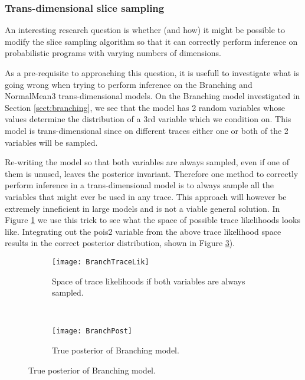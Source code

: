 \subsubsection{Trans-dimensional slice sampling}
\label{sect:tdSlice}
An interesting research question is whether (and how) it might be possible to modify the slice sampling algorithm so that it can correctly perform inference on probabilistic programs with varying numbers of dimensions.

As a pre-requisite to approaching this question, it is usefull to investigate what is going wrong when trying to perform inference on the Branching and NormalMean3 trans-dimensional models. On the Branching model investigated in Section \ref{sect:branching}, we see that the model has 2 random variables whose values determine the distribution of a 3rd variable which we condition on. This model is trans-dimensional since on different traces either one or both of the 2 variables will be sampled.

Re-writing the model so that both variables are always sampled, even if one of them is unused, leaves the posterior invariant. Therefore one method to correctly perform inference in a trans-dimensional model is to always sample all the variables that might ever be used in any trace. This approach will however be extremely inneficient in large models and is not a viable general solution. In Figure \ref{fig:branchTraceLik} we use this trick to see what the space of possible trace likelihoods looks like. Integrating out the pois2 variable from the above trace likelihood space results in the correct posterior distribution, shown in Figure \ref{fig:branchPost}).

\begin{figure}[h]
        \centering
        \begin{subfigure}[b]{0.48\textwidth}
                \centering
                \texttt{[image: BranchTraceLik]}
                \caption{Space of trace likelihoods if both variables are always sampled.}
                \label{fig:branchTraceLik}
        \end{subfigure}
        ~ 
        \begin{subfigure}[b]{0.48\textwidth}
                \centering
                \texttt{[image: BranchPost]}
                \caption{True posterior of Branching model.}
                \label{fig:branchPost}
        \end{subfigure}
\end{figure}

